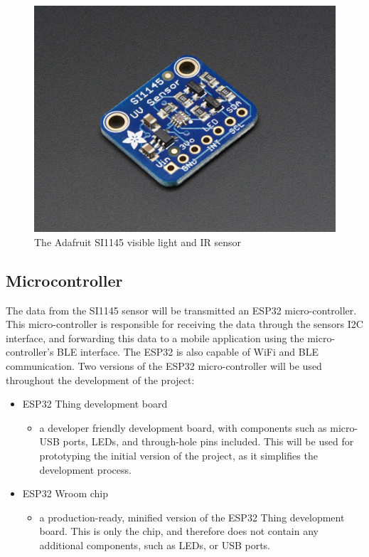 \documentclass[12pt,openany,a4paper]{book}
\newcommand{\fig}[1]  {Fig.\,\ref{#1}}		%
\begin{document}
\begin{figure}[h]
\centerline{\includegraphics[width=.5\textwidth]{AdafruitSI1145.jpg}}
\caption{The Adafruit SI1145 visible light and IR sensor}
\label{fig:adafruit_si1145}
\end{figure}

\subsection{Microcontroller}

The data from the SI1145 sensor will be transmitted an ESP32 micro-controller.
This micro-controller is responsible for receiving the data through the sensors
I2C interface, and forwarding this data to a mobile application using the
micro-controller's BLE interface. The ESP32 is also capable of WiFi and BLE
communication. Two versions of the ESP32 micro-controller will be used throughout
the development of the project:

\begin{itemize}
	\item ESP32 Thing development board~\cite[\fig{fig:sparkfun_thing}]{sparkfun_thing}
	\begin{itemize}
		\item a developer friendly development board, with
		components such as micro-USB ports, LEDs, and through-hole pins included. This
		will be used for prototyping the initial version of the project, as it simplifies
		the development process.
	\end{itemize}
	\item ESP32 Wroom chip~\cite[\fig{fig:sparkfun_wroom}]{sparkfun_wroom}
	\begin{itemize}
		\item a production-ready, minified version of the ESP32 Thing
		development board. This is only the chip, and therefore does not contain any
		additional components, such as LEDs, or USB ports.
	\end{itemize}
\end{itemize}
\end{document}

